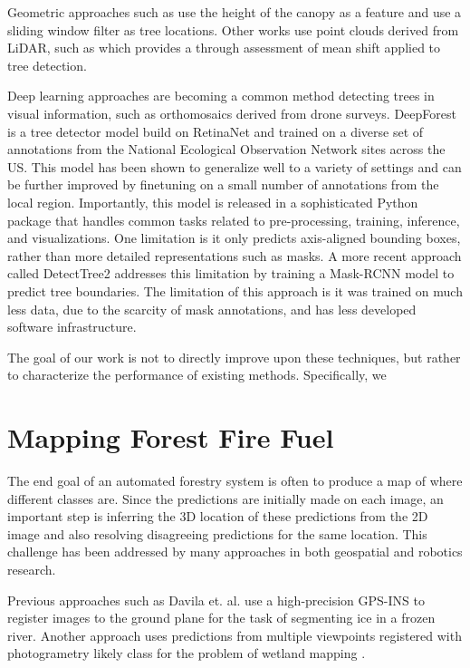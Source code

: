 Geometric approaches such as \cite{Popescu2004SeeingHeight} use the height of the canopy as a feature and use a sliding window filter as tree locations. Other works use point clouds derived from LiDAR, such as \cite{Xiao2019MeanData} which provides a through assessment of mean shift applied to tree detection.

Deep learning approaches are becoming a common method detecting trees in visual information, such as orthomosaics derived from drone surveys. DeepForest \cite{Weinstein2020DeepForest:Delineation} is a tree detector model build on RetinaNet \cite{Lin2020FocalDetection} and trained on
a diverse set of annotations from the National Ecological Observation Network sites
\cite{Keller2008ANetwork} across the US. This model has been shown to generalize well to a variety of settings and can be further improved by finetuning on a small number of annotations from the local region. Importantly, this model is released in a sophisticated Python package that handles common tasks related to pre-processing, training, inference, and visualizations. One limitation is it only predicts axis-aligned bounding boxes, rather than more detailed representations such as masks. A more recent approach called DetectTree2 \cite{DetectTree2} addresses this limitation by training a Mask-RCNN \cite{He2017MaskR-CNN} model to predict tree boundaries. The limitation of this approach is it was trained on much less data, due to the scarcity of mask annotations, and has less developed software infrastructure.

The goal of our work is not to directly improve upon these techniques, but rather to characterize the performance of existing methods. Specifically, we 


\section{Mapping Forest Fire Fuel}

The end goal of an automated forestry system is often to produce a map of where different classes are. Since the predictions are initially made on each image, an important step is inferring the 3D location of these predictions from the 2D image and also resolving disagreeing predictions for the same location. This challenge has been addressed by many approaches in both geospatial and robotics research. 

Previous approaches such as Davila et. al. use a high-precision GPS-INS to register images \cite{Davila2022ADAPT:AI} to the ground plane for the task of segmenting ice in a frozen river. 
Another approach uses predictions from multiple viewpoints registered with photogrametry likely class for the problem of wetland mapping 
\cite{Liu2018DeepClassification}.

